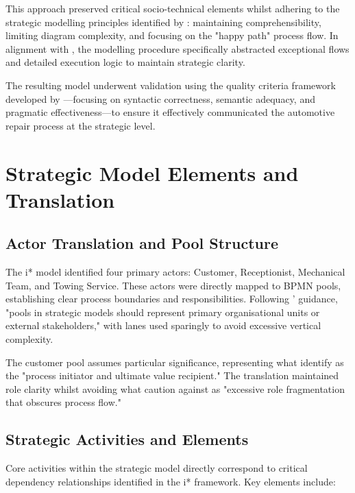 \documentclass[14pt,a4paper]{article}
\begin{document}
This approach preserved critical socio-technical elements whilst adhering to the strategic modelling principles identified by \textit{\parencite[p. 177]{Silver2011}}: maintaining comprehensibility, limiting diagram complexity, and focusing on the "happy path" process flow. In alignment with \textit{\parencite[p. 92]{Flowers2016}}, the modelling procedure specifically abstracted exceptional flows and detailed execution logic to maintain strategic clarity.

The resulting model underwent validation using the quality criteria framework developed by \textit{\parencite[p. 136]{Corradini2018}}—focusing on syntactic correctness, semantic adequacy, and pragmatic effectiveness—to ensure it effectively communicated the automotive repair process at the strategic level.

\section{Strategic Model Elements and Translation}

\subsection{Actor Translation and Pool Structure}

The i* model identified four primary actors: Customer, Receptionist, Mechanical Team, and Towing Service. These actors were directly mapped to BPMN pools, establishing clear process boundaries and responsibilities. Following \textit{\parencite[p. 103]{Kluza2017}}' guidance, "pools in strategic models should represent primary organisational units or external stakeholders," with lanes used sparingly to avoid excessive vertical complexity.

The customer pool assumes particular significance, representing what \textit{\parencite[p. 217]{Dumas2018}} identify as the "process initiator and ultimate value recipient." The translation maintained role clarity whilst avoiding what \textit{\parencite[p. 67]{Geiger2018}} caution against as "excessive role fragmentation that obscures process flow."

\subsection{Strategic Activities and Elements}

Core activities within the strategic model directly correspond to critical dependency relationships identified in the i* framework. Key elements include:
\end{document}
